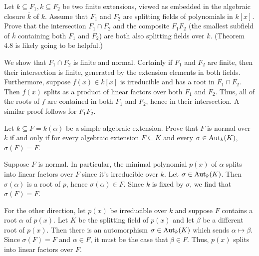 \documentclass[../../master.tex]{subfiles}
\begin{document}
\begin{problem}
    Let $k \subseteq F_1, k \subseteq F_2$ be two finite extensions, viewed as embedded in the algebraic closure $\overline{k}$ of $k$.
    Assume that $F_1$ and $F_2$ are splitting fields of polynomials in $k[x]$.
    Prove that the intersection $F_1 \cap F_2$ and the composite $F_1 F_2$ (the smallest subfield of $\overline{k}$ containing both $F_1$ and $F_2$) are both also splitting fields over $k$.
    (Theorem 4.8 is likely going to be helpful.)
\end{problem}

\begin{solution}
    We show that $F_1 \cap F_2$ is finite and normal.
    Certainly if $F_1$ and $F_2$ are finite, then their intersection is finite, generated by the extension elements in both fields.
    Furthermore, suppose $f(x) \in k[x]$ is irreducible and has a root in $F_1 \cap F_2$.
    Then $f(x)$ splits as a product of linear factors over both $F_1$ and $F_2$.
    Thus, all of the roots of $f$ are contained in both $F_1$ and $F_2$, hence in their intersection.
    A similar proof follows for $F_1 F_2$.
\end{solution}

\begin{problem}
    Let $k \subseteq F = k(\alpha)$ be a simple algebraic extension.
    Prove that $F$ is normal over $k$ if and only if for every algebraic extension $F \subseteq K$ and every $\sigma \in \operatorname{Aut}_k(K)$, $\sigma(F) = F$.
\end{problem}

\begin{solution}
    Suppose $F$ is normal.
    In particular, the minimal polynomial $p(x)$ of $\alpha$ splits into linear factors over $F$ since it's irreducible over $k$.
    Let $\sigma \in \operatorname{Aut}_k(K)$.
    Then $\sigma(\alpha)$ is a root of $p$, hence $\sigma(\alpha) \in F$.
    Since $k$ is fixed by $\sigma$, we find that $\sigma(F) = F$.

    For the other direction, let $p(x)$ be irreducible over $k$ and suppose $F$ contains a root $\alpha$ of $p(x)$.
    Let $K$ be the splitting field of $p(x)$ and let $\beta$ be a different root of $p(x)$.
    Then there is an automorphism $\sigma \in \operatorname{Aut}_k(K)$ which sends $\alpha \mapsto \beta$.
    Since $\sigma(F) = F$ and $\alpha \in F$, it must be the case that $\beta \in F$.
    Thus, $p(x)$ splits into linear factors over $F$.
\end{solution}
\end{document}
